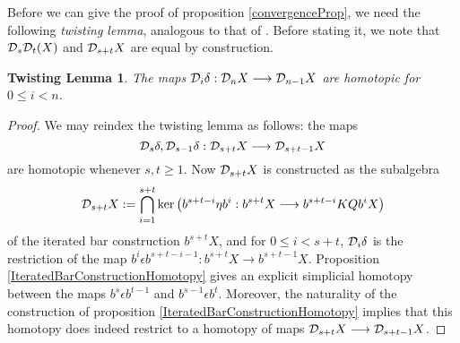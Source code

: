 \documentclass[11pt]{amsart}
\theoremstyle{plain}
\newtheorem{twistinglemma}[thm]{Twisting Lemma}
\newcommand{\caldup}[1]{\calD_{\smash{#1}}}
\begin{document}
Before we can give the proof of proposition \ref{convergenceProp}, we need the following \emph{twisting lemma}, analogous to that of \cite{BK_pairings.pdf}. Before stating it, we note that $\caldup{s}\caldup{t}(X)$ and $\caldup{s+t}X$ are equal by construction.
\begin{twistinglemma}
\label{DsDt=Dt+s}
The maps $\caldup{i}\delta:\caldup{n}X\to \caldup{n-1}X$ are homotopic for $0\leq i< n$.
\end{twistinglemma}
\begin{proof}
We may reindex the twisting lemma as follows: the maps 
\[\caldup{s}\delta,\caldup{s-1}\delta:\caldup{s+t}X\to \caldup{s+t-1}X\]
are homotopic whenever $s,t\geq1$. Now $\caldup{s+t}X$ is constructed as the subalgebra
\[\caldup{s+t}X:= \bigcap_{i=1}^{s+t}\ker\!\left(b^{s+t-i}\eta b^{i}:b^{s+t}X\to b^{s+t-i}KQb^{i}X\right)\]
of the iterated bar construction $b^{s+t}X$, and for $0\leq i<s+t$, $\caldup{i}\delta$ is the restriction of the map $b^i\epsilon b^{s+t-i-1}:b^{s+t}X\to b^{s+t-1}X$.
%
Proposition \ref{IteratedBarConstructionHomotopy} gives an explicit simplicial homotopy between the maps $b^s\epsilon b^{t-1}$ and $b^{s-1}\epsilon b^{t}$. Moreover, the naturality of the construction of proposition \ref{IteratedBarConstructionHomotopy} implies that this homotopy does indeed restrict to a homotopy of maps $\caldup{s+t}X\to \caldup{s+t-1}X$.%
\end{proof}
\end{document}

